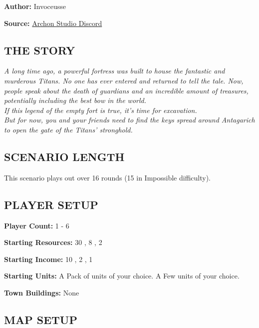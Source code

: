
\begin{multicols*}{2}

\textbf{Author:} Invoceusse

\textbf{Source:} \href{https://discord.com/channels/740870068178649108/1219333721019256943}{Archon Studio Discord}

\subsection*{\MakeUppercase{The story}}
\textit{A long time ago, a powerful fortress was built to house the fantastic and murderous Titans.
  No one has ever entered and returned to tell the tale.
  Now, people speak about the death of guardians and an incredible amount of treasures, potentially including the best bow in the world.\\
  If this legend of the empty fort is true, it's time for excavation.\\
  But for now, you and your friends need to find the keys spread around Antagarich to open the gate of the Titans' stronghold.
}
\subsection*{\MakeUppercase{Scenario length}}

This scenario plays out over 16 rounds (15 in Impossible difficulty).

\subsection*{\MakeUppercase{Player setup}}

\textbf{Player Count:} 1 - 6

\textbf{Starting Resources:} 30 , 8 , 2 

\textbf{Starting Income:} 10 , 2 , 1 

\textbf{Starting Units:} 
    A Pack of  units of your choice.
    A Few  units of your choice.

\textbf{Town Buildings:} None

\subsection*{\MakeUppercase{Map setup}}


\end{multicols*}
